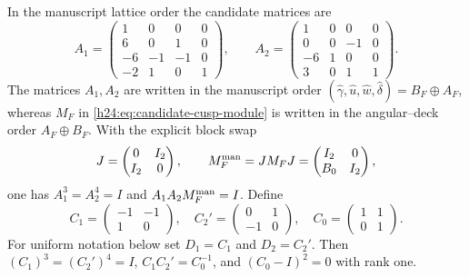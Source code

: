 In the manuscript lattice order the candidate matrices are
\begin{equation}
 A_1=\begin{pmatrix}1&0&0&0\\6&0&1&0\\-6&-1&-1&0\\-2&1&0&1\end{pmatrix},
 \qquad
 A_2=\begin{pmatrix}1&0&0&0\\0&0&-1&0\\-6&1&0&0\\3&0&1&1\end{pmatrix}.
 \label{h24:eq:finite-candidate-matrices}
\end{equation}
The matrices $A_1,A_2$ are written in the manuscript order
$(\widehat\gamma,\widehat u,\widehat w,\widehat\delta)=B_F\oplus A_F$,
whereas $M_F$ in \eqref{h24:eq:candidate-cusp-module} is written in the
angular--deck order $A_F\oplus B_F$.  With the explicit block swap
\begin{equation}
 J=\begin{pmatrix}0&I_2\\ I_2&0\end{pmatrix},\qquad
 M_F^{\rm man}=JM_FJ=
 \begin{pmatrix}I_2&0\\ B_0&I_2\end{pmatrix},
 \label{h24:eq:manuscript-cusp-order}
\end{equation}
one has
$A_1^3=A_2^4=I$ and $A_1A_2M_F^{\rm man}=I$.  Define
\begin{equation}
 C_1=\begin{pmatrix}-1&-1\\1&0\end{pmatrix},\quad
 C_2'=\begin{pmatrix}0&1\\-1&0\end{pmatrix},\quad
 C_0=\begin{pmatrix}1&1\\0&1\end{pmatrix}.
\label{h24:eq:elliptic-peripheral-matrices}
\end{equation}
For uniform notation below set $D_1=C_1$ and $D_2=C_2'$.
Then $(C_1)^3=(C_2')^4=I$, $C_1C_2'=C_0^{-1}$, and
$(C_0-I)^2=0$ with rank one.

